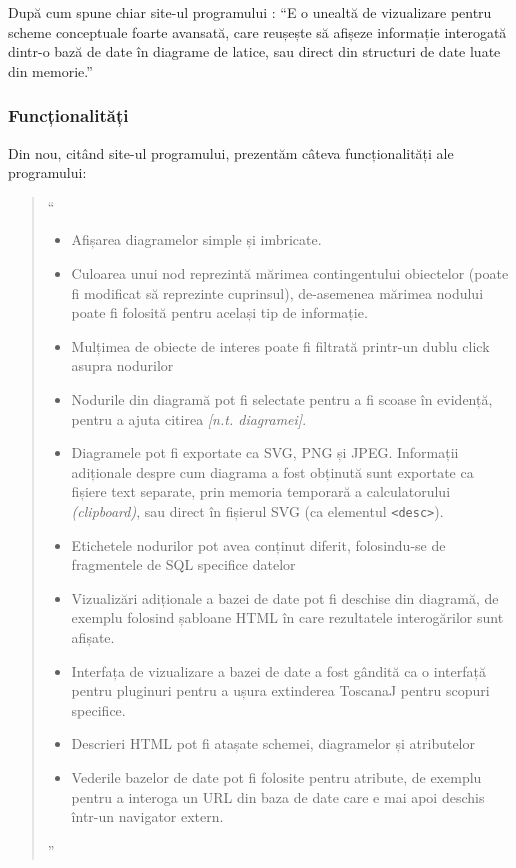 \documentclass[12pt, a4paper, twoside, romanian]{teza-upb}
\begin{document}
      După cum spune chiar site-ul programului \cite{Toscanaj:toscanaj}: ``E o unealtă de vizualizare pentru scheme conceptuale foarte avansată, care reușește să afișeze informație interogată dintr-o bază de date în diagrame de latice, sau direct din structuri de date luate din memorie.''
      \subsubsection{Funcționalități}
      \label{subsubsec:toscanaj-functionalitati}
      
        Din nou, citând site-ul programului\cite{Toscanaj:toscanaj}, prezentăm câteva funcționalități ale programului:

        \begin{quote}
          ``
          \begin{itemize}
            \item Afișarea diagramelor simple și imbricate.
            \item Culoarea unui nod reprezintă mărimea contingentului obiectelor (poate fi modificat să reprezinte cuprinsul), de-asemenea mărimea nodului poate fi folosită pentru același tip de informație.
            \item Mulțimea de obiecte de interes poate fi filtrată printr-un dublu click asupra nodurilor
            \item Nodurile din diagramă pot fi selectate pentru a fi scoase în evidență, pentru a ajuta citirea \textit{[n.t. diagramei]}.
            \item Diagramele pot fi exportate ca SVG, PNG și JPEG. Informații adiționale despre cum diagrama a fost obținută sunt exportate ca fișiere text separate, prin memoria temporară a calculatorului \textit{(clipboard)}, sau direct în fișierul SVG (ca elementul \verb=<desc>=).
            \item Etichetele nodurilor pot avea conținut diferit, folosindu-se de fragmentele de SQL specifice datelor
            \item Vizualizări adiționale a bazei de date pot fi deschise din diagramă, de exemplu folosind șabloane HTML în care rezultatele interogărilor sunt afișate.
            \item Interfața de vizualizare a bazei de date a fost gândită ca o interfață pentru pluginuri pentru a ușura extinderea ToscanaJ pentru scopuri specifice.
            \item Descrieri HTML pot fi atașate schemei, diagramelor și atributelor
            \item Vederile bazelor de date pot fi folosite pentru atribute, de exemplu pentru a interoga un URL din baza de date care e mai apoi deschis într-un navigator extern.
          \end{itemize}
          ''
        \end{quote}
\end{document}
